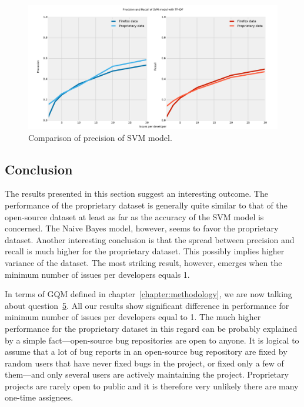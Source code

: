\begin{figure}[htbp]
    \centering
        \includegraphics[width=\textwidth]{./images/prop_vs_os/svm_precision_and_recall.pdf}
    \caption{Comparison of precision of SVM model.}
    \label{fig:results.datasets.svm_pr}
\end{figure}

\subsection{Conclusion}

The results presented in this section suggest an interesting outcome. The performance of the proprietary dataset is generally quite similar to that of the open-source dataset at least as far as the accuracy of the SVM model is concerned. The Naive Bayes model, however, seems to favor the proprietary dataset. Another interesting conclusion is that the spread between precision and recall is much higher for the proprietary dataset. This possibly implies higher variance of the dataset. The most striking result, however, emerges when the minimum number of issues per developers equals 1.

In terms of GQM defined in chapter~\ref{chapter:methodology}, we are now talking about question~\hyperlink{question:5}{5}. All our results show significant difference in performance for minimum number of issues per developers equal to 1. The much higher performance for the proprietary dataset in this regard can be probably explained by a simple fact---open-source bug repositories are open to anyone. It is logical to assume that a lot of bug reports in an open-source bug repository are fixed by random users that have never fixed bugs in the project, or fixed only a few of them---and only several users are actively maintaining the project. Proprietary projects are rarely open to public and it is therefore very unlikely there are many one-time assignees.

